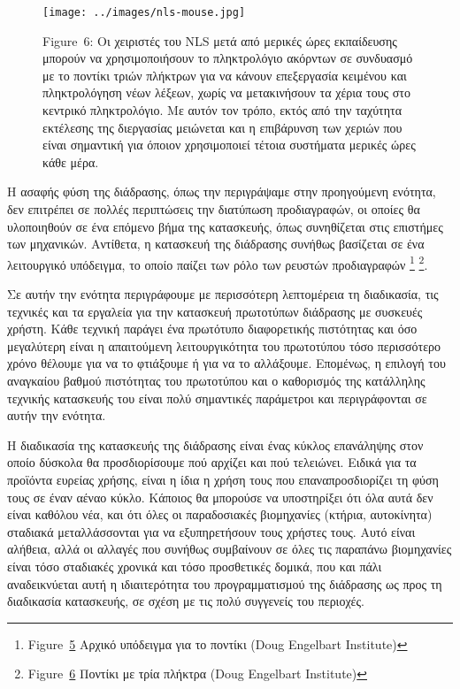 \documentclass[
]{article}
\begin{document}
\leavevmode{}%
\begin{figure}
\hypertarget{fig:nls-mouse}{%
\centering
\texttt{[image: ../images/nls-mouse.jpg]}
\caption{Figure~6: Οι χειριστές του NLS μετά από μερικές ώρες
εκπαίδευσης μπορούν να χρησιμοποιήσουν το πληκτρολόγιο ακόρντων σε
συνδυασμό με το ποντίκι τριών πλήκτρων για να κάνουν επεξεργασία
κειμένου και πληκτρολόγηση νέων λέξεων, χωρίς να μετακινήσουν τα χέρια
τους στο κεντρικό πληκτρολόγιο. Με αυτόν τον τρόπο, εκτός από την
ταχύτητα εκτέλεσης της διεργασίας μειώνεται και η επιβάρυνση των χεριών
που είναι σημαντική για όποιον χρησιμοποιεί τέτοια συστήματα μερικές
ώρες κάθε μέρα.}\label{fig:nls-mouse}
}
\end{figure}

Η ασαφής φύση της διάδρασης, όπως την περιγράψαμε στην προηγούμενη
ενότητα, δεν επιτρέπει σε πολλές περιπτώσεις την διατύπωση προδιαγραφών,
οι οποίες θα υλοποιηθούν σε ένα επόμενο βήμα της κατασκευής, όπως
συνηθίζεται στις επιστήμες των μηχανικών. Αντίθετα, η κατασκευή της
διάδρασης συνήθως βασίζεται σε ένα λειτουργικό υπόδειγμα, το οποίο
παίζει των ρόλο των ρευστών προδιαγραφών \footnote{Figure~\protect\hyperlink{fig:engelbart-mouse}{5}
  Αρχικό υπόδειγμα για το ποντίκι (Doug Engelbart Institute)}
\footnote{Figure~\protect\hyperlink{fig:nls-mouse}{6} Ποντίκι με τρία
  πλήκτρα (Doug Engelbart Institute)}.

Σε αυτήν την ενότητα περιγράφουμε με περισσότερη λεπτομέρεια τη
διαδικασία, τις τεχνικές και τα εργαλεία για την κατασκευή πρωτοτύπων
διάδρασης με συσκευές χρήστη. Κάθε τεχνική παράγει ένα πρωτότυπο
διαφορετικής πιστότητας και όσο μεγαλύτερη είναι η απαιτούμενη
λειτουργικότητα του πρωτοτύπου τόσο περισσότερο χρόνο θέλουμε για να το
φτιάξουμε ή για να το αλλάξουμε. Επομένως, η επιλογή του αναγκαίου
βαθμού πιστότητας του πρωτοτύπου και ο καθορισμός της κατάλληλης
τεχνικής κατασκευής του είναι πολύ σημαντικές παράμετροι και
περιγράφονται σε αυτήν την ενότητα.

Η διαδικασία της κατασκευής της διάδρασης είναι ένας κύκλος επανάληψης
στον οποίο δύσκολα θα προσδιορίσουμε πού αρχίζει και πού τελειώνει.
Ειδικά για τα προϊόντα ευρείας χρήσης, είναι η ίδια η χρήση τους που
επαναπροσδιορίζει τη φύση τους σε έναν αέναο κύκλο. Κάποιος θα μπορούσε
να υποστηρίξει ότι όλα αυτά δεν είναι καθόλου νέα, και ότι όλες οι
παραδοσιακές βιομηχανίες (κτήρια, αυτοκίνητα) σταδιακά μεταλλάσσονται
για να εξυπηρετήσουν τους χρήστες τους. Αυτό είναι αλήθεια, αλλά οι
αλλαγές που συνήθως συμβαίνουν σε όλες τις παραπάνω βιομηχανίες είναι
τόσο σταδιακές χρονικά και τόσο προσθετικές δομικά, που και πάλι
αναδεικνύεται αυτή η ιδιαιτερότητα του προγραμματισμού της διάδρασης ως
προς τη διαδικασία κατασκευής, σε σχέση με τις πολύ συγγενείς του
περιοχές.
\end{document}
